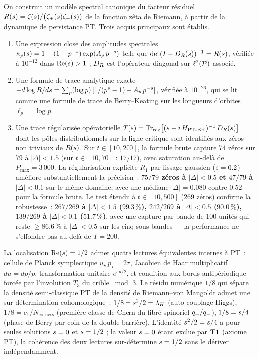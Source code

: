On construit un modèle spectral canonique du facteur résiduel
$R(s) = \zeta(s) / \big(\zeta_{+}(s)\zeta_{-}(s)\big)$ de la fonction
zêta de Riemann, à partir de la dynamique de persistance PT. Trois acquis
principaux sont établis.
\begin{enumerate}[nosep,leftmargin=*]
\item Une expression close des amplitudes spectrales
$\kappa_p(s) = 1 - (1 - p^{-s})\exp(A_p\,p^{-s})$ telle que
$\det(I - D_R(s))^{-1} = R(s)$, vérifiée à $10^{-12}$ dans
$\operatorname{Re}(s) > 1$ ; $D_R$ est l'opérateur diagonal sur $\ell^{2}(\mathcal{P})$
associé.
\item Une formule de trace analytique exacte
$-d \log R/ds = \sum_p (\log p)\,[1/(p^s - 1) + A_p\,p^{-s}]$, vérifiée
à $10^{-26}$, qui se lit comme une formule de trace de Berry--Keating sur
les longueurs d'orbites $\ell_p = \log p$.
\item Une trace régularisée opératorielle
$T(s) = \operatorname{Tr}_{\mathrm{reg}}\!\big[(s - i\,H_{\mathrm{PT\text{-}BK}})^{-1}\,D_R(s)\big]$
dont les pôles distributionnels sur la ligne critique sont identifiés aux
zéros non triviaux de $R(s)$. Sur $t \in [10, 200]$, la formule brute
capture 74 zéros sur 79 à $|\Delta| < 1.5$ (sur $t \in [10, 70]$ : $17/17$),
avec saturation au-delà de $P_{\max} = 3\,000$. La régularisation explicite
$R_1$ par lissage gaussien ($\varepsilon = 0.2$) améliore substantiellement la
précision~: \textbf{$75/79$ zéros à $|\Delta| < 0.5$ et $47/79$ à
$|\Delta| < 0.1$} sur le même domaine, avec une médiane $|\Delta| = 0.080$
contre $0.52$ pour la formule brute. Le test étendu à $t \in [10, 500]$
($269$ zéros) confirme la robustesse~: \textbf{$267/269$ à $|\Delta| < 1.5$
($99.3\,\%$), $242/269$ à $|\Delta| < 0.5$ ($90.0\,\%$), $139/269$ à
$|\Delta| < 0.1$ ($51.7\,\%$)}, avec une capture par bande de 100 unités
qui reste $\ge 86.6\,\%$ à $|\Delta| < 0.5$ sur les cinq sous-bandes --- la
performance ne s'effondre pas au-delà de $T = 200$.
\end{enumerate}

La localisation $\operatorname{Re}(s) = 1/2$ admet quatre lectures équivalentes
internes à PT~: cellule de Planck symplectique $u_\star\, p_\star = 2\pi$,
Jacobien de Haar multiplicatif $du = dp/p$, transformation unitaire
$e^{su/2}$, et condition aux bords antipériodique forcée par l'involution
$T_3$ du crible $\bmod\,3$. Le résidu numérique $1/8$ qui sépare la densité
semi-classique PT de la densité de Riemann--von Mangoldt admet une
sur-détermination cohomologique~: $1/8 = s^{2}/2 = \lambda_H$
(auto-couplage Higgs), $1/8 = c_1/N_{\mathrm{corners}}$ (première classe
de Chern du fibré spinoriel $q_{+}/q_{-}$), $1/8 = s/4$ (phase de
Berry par coin de la double barrière). L'identité $s^{2}/2 = s/4$
a pour seules solutions $s = 0$ et $s = 1/2$ ; la valeur $s = 0$
étant exclue par $\textbf{T1}$ (axiome PT), la cohérence des deux lectures
sur-détermine $s = 1/2$ sans le dériver indépendamment.

